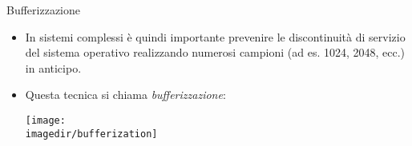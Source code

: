 %
%
%
%
%
\setcounter{ms}{1}
\begin{slide}{Bufferizzazione}
{

	\begin{itemize}

		\item In sistemi complessi \`e quindi importante
              prevenire le discontinuit\`a di servizio
              del sistema operativo realizzando numerosi
              campioni (ad es. 1024, 2048, ecc.) in anticipo.

		\item Questa tecnica si chiama \emph{bufferizzazione}:

			  \begin{center}
				\texttt{[image: \\imagedir/bufferization]}
			  \end{center}

	\end{itemize}
}
\end{slide}
